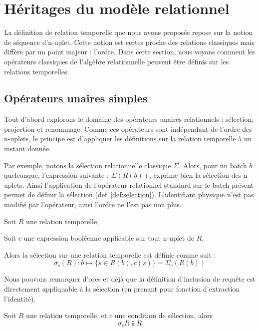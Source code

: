 \section{Héritages du modèle relationnel}\label{sec:contrib:astral:relationnel}
La définition de relation temporelle que nous avons proposée repose sur la notion de séquence d'n-uplet. Cette notion est certes proche des relations classiques mais diffère par un point majeur : l'ordre. Dans cette section, nous voyons comment les opérateurs classiques de l'algèbre relationnelle peuvent être définis sur les relations temporelles.

\subsection{Opérateurs unaires simples}
Tout d'abord explorons le domaine des opérateurs unaires relationnels : sélection, projection et renommage. Comme ces opérateurs sont indépendant de l'ordre des n-uplets, le principe est d'appliquer les définitions sur la relation temporelle à un instant donnée.

Par exemple, notons la sélection relationnelle classique $\Sigma$. Alors, pour un batch $b$ quelconque, l'expression suivante : $\Sigma(R(b))$, exprime bien la sélection des n-uplets. Ainsi l'application de l'opérateur relationnel standard sur le batch présent permet de définir la sélection (def~\ref{def:selection}). L'identifiant physique n'est pas modifié par l'opérateur, ainsi l'ordre ne l'est pas non plus.
\begin{defi}[Sélection]\label{def:selection}
Soit $R$ une relation temporelle,

Soit $c$ une expression booléenne applicable sur tout n-uplet de $R$,

Alors la sélection sur une relation temporelle est définie comme suit :
$$\sigma_{c}(R) : b \mapsto \{s\in R(b), c(s)\} = \Sigma_c(R(b))$$
\end{defi}

Nous pouvons remarquer d'ores et déjà que la définition d'inclusion de requête est directement appliquable à la sélection (en prenant pour fonction d'extraction l'identité).
\begin{prop}
Soit $R$ une relation temporelle, et $c$ une condition de sélection, alors $$\sigma_c R \subseteqq R$$
\end{prop}

